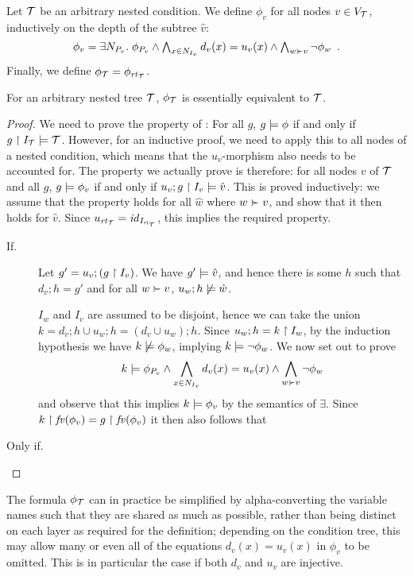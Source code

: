 Let ${\mathcal{T}}$ be an arbitrary nested condition. We define $\phi_v$ for all nodes $v\in V_{\mathcal{T}}$, inductively on the depth of the subtree $\hat v$:
%
\[ \phi_v = \textstyle \exists N_{P_v}\st \phi_{P_v}\wedge \bigwedge_{x\in N_{I_v}} d_v(x)=u_v(x) \wedge \bigwedge_{w\childof v} \neg\phi_w \enspace. \]
%
Finally, we define $\phi_{\mathcal{T}}=\phi_{\mathit{rt}_{{\mathcal{T}}}}$.
%
\begin{theorem}
For an arbitrary nested tree ${\mathcal{T}}$, $\phi_{\mathcal{T}}$ is essentially equivalent to ${\mathcal{T}}$.
\end{theorem}
%
\begin{proof}
We need to prove the property of : For all $g$, $g\models \phi$ if and only if $g\restriction I_{\mathcal{T}}\models {\mathcal{T}}$. However, for an inductive proof, we need to apply this to all nodes of a nested condition, which means that the $u_v$-morphism also needs to be accounted for. The property we actually prove is therefore: for all nodes $v$ of ${\mathcal{T}}$ and all $g$, $g\models \phi_v$ if and only if $u_v;g\restriction I_v\models \hat v$. This is proved inductively: we assume that the property holds for all $\hat w$ where $w\childof v$, and show that it then holds for $\hat v$. Since $u_{\mathit{rt}_{{\mathcal{T}}}}={\mathit{id}}_{I_{\mathit{rt}_{{\mathcal{T}}}}}$, this implies the required property.
%
\begin{description}
\item[If.] Let $g'=u_v;(g\restriction I_v)$. We have $g'\models \hat v$, and hence there is some $h$ such that $d_v;h=g'$ and for all $w\childof v$, $u_w;h\not\models \hat w$.

$I_w$ and $I_v$ are assumed to be disjoint, hence we can take the union $k=d_v;h\cup u_w;h=(d_v\cup u_w);h$. Since $u_w;h=k\restriction I_w$, by the induction hypothesis we have $k\not\models \phi_w$, implying $k\models \neg \phi_w$. We now set out to prove
%
\[ k\sat \phi_{P_v}\wedge \bigwedge_{x\in N_{I_v}} d_v(x)=u_v(x) \wedge \bigwedge_{w\childof v} \neg\phi_w \]
%
and observe that this implies $k\models \phi_v$ by the semantics of $\exists$. Since $k\restriction \mathit{fv}(\phi_v)=g\restriction \mathit{fv}(\phi_v)$ it then also follows that 
\item[Only if.] 
\end{description}
\end{proof}
%
The formula $\phi_{\mathcal{T}}$ can in practice be simplified by alpha-converting the variable names such that they are shared as much as possible, rather than being distinct on each layer as required for the definition; depending on the condition tree, this may allow many or even all of the equations $d_v(x)=u_v(x)$ in $\phi_v$ to be omitted. This is in particular the case if both $d_v$ and $u_v$ are injective.

